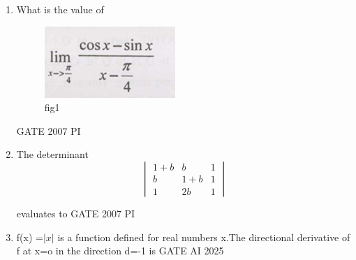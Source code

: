 \documentclass[journal,12pt,onecolumn]{IEEEtran}
\theoremstyle{remark}
\begin{document}
\begin{enumerate}
      \item 
        What is the value of
\begin{figure}[H]
    \centering
    \includegraphics[width=0.25\linewidth]{figs/Q.4.png}
    \caption{fig1}
    \label{figs:figs/Q.4.png}
\end{figure}
\hfill{GATE 2007 PI}
\begin{enumerate}
     \end{enumerate} 
    
    \item 
    The determinant
\[
\begin{vmatrix}
1+b & b & 1 \\
b & 1+b & 1 \\
1 & 2b & 1
\end{vmatrix}
\]

evaluates to
\hfill{GATE 2007 PI}
\begin{enumerate}
\end{enumerate}

\item 
f(x) =$|x|$ is a function defined for real numbers x.The directional derivative of f at x=o in the direction d=-1 is
\hfill{GATE AI 2025}
\begin{enumerate}
\end{enumerate}


\end{enumerate}
\end{document}
